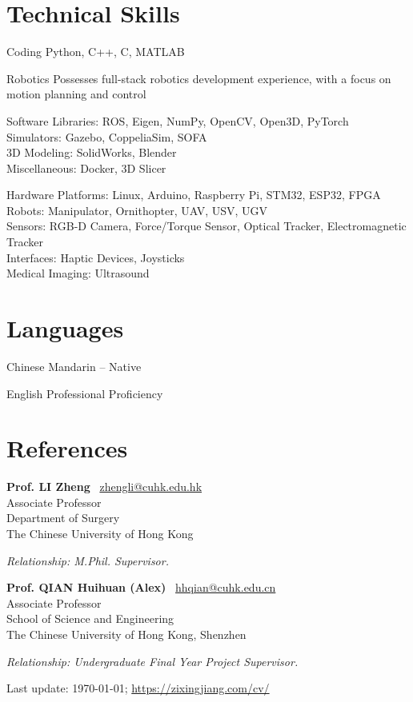 \documentclass[11pt,letterpaper]{report}
\newcommand{\listitemspace}{0.25em}
\renewenvironment{itemize}
{\begin{list}{}{\setlength{\leftmargin}{0em}
			\setlength{\parskip}{0em}
			\setlength{\itemsep}{\listitemspace}
			\setlength{\parsep}{\listitemspace}}}
	{\end{list}}
\begin{document}
\section*{Technical Skills}
\begin{tablist}
	\item[Coding] \tab Python, C++, C, MATLAB
	\item[Robotics] \tab Possesses full-stack robotics development experience, with a focus on motion planning and control
	\item[Software] \tab Libraries: ROS, Eigen, NumPy, OpenCV, Open3D, PyTorch\\
	Simulators: Gazebo, CoppeliaSim, SOFA\\
	3D Modeling: SolidWorks, Blender\\
	Miscellaneous: Docker, 3D Slicer
	\item[Hardware] \tab Platforms: Linux, Arduino, Raspberry Pi, STM32, ESP32, FPGA\\
	Robots: Manipulator, Ornithopter, UAV, USV, UGV\\ 
	Sensors: RGB-D Camera, Force/Torque Sensor, Optical Tracker, Electromagnetic Tracker\\
	Interfaces: Haptic Devices, Joysticks\\
	Medical Imaging: Ultrasound
\end{tablist}


\section*{Languages}
\begin{tablist}
	\item[Chinese] \tab Mandarin -- Native
	\item[English] \tab Professional Proficiency
\end{tablist}
\newpage
\section*{References}
\begin{itemize}
	\item \textbf{Prof. LI Zheng} ~{\scriptsize \faEnvelope}\href{mailto:zhengli@cuhk.edu.hk}{zhengli@cuhk.edu.hk}\\
	Associate Professor\\
	Department of Surgery\\
	The Chinese University of Hong Kong
	
	\textit{Relationship: M.Phil. Supervisor.}

	\vspace{1ex}
	
	\item \textbf{Prof. QIAN Huihuan (Alex)} ~{\scriptsize \faEnvelope}\href{mailto:hhqian@cuhk.edu.cn}{hhqian@cuhk.edu.cn}\\
	Associate Professor\\School of Science and Engineering\\The Chinese University of Hong Kong, Shenzhen

	\textit{Relationship: Undergraduate Final Year Project Supervisor.}

\end{itemize}
	
\begin{center}
	\vfill
	Last update: \monthyeardate\today; \href{https://zixingjiang.com/cv/}{https://zixingjiang.com/cv/}
\end{center}
	
\end{document}
